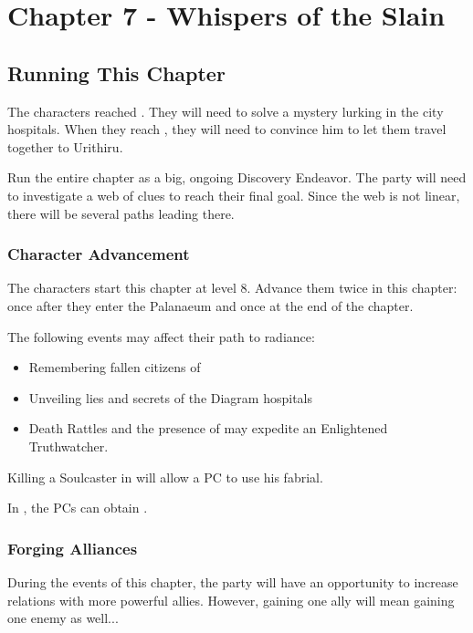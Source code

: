 \chapter{Chapter 7 - Whispers of the Slain}
\label{chap:chapter7}

\setcounter{section}{-1}
\section{Running This Chapter}

The characters reached \locationKharbranth{}. They will need to solve a mystery lurking in the city hospitals. When they reach \npcTaravangian{}, they will need to convince him to let them travel together to Urithiru.

Run the entire chapter as a big, ongoing Discovery Endeavor. The party will need to investigate a web of clues to reach their final goal. Since the web is not linear, there will be several paths leading there.



\subsection{Character Advancement}

The characters start this chapter at level 8. Advance them twice in this chapter: once after they enter the Palanaeum and once at the end of the chapter.

The following events may affect their path to radiance:
\begin{itemize}
	\item Remembering fallen citizens of \locationKharbranth{}
	\item Unveiling lies and secrets of the Diagram hospitals
	\item Death Rattles and the presence of \npcMoelach{} may expedite an Enlightened Truthwatcher.
\end{itemize}

Killing a Soulcaster in  will allow a PC to use his fabrial.

In , the PCs can obtain \abilityFutureKnowledgeName[1]{}.



\subsection{Forging Alliances}

During the events of this chapter, the party will have an opportunity to increase relations with more powerful allies. However, gaining one ally will mean gaining one enemy as well...

